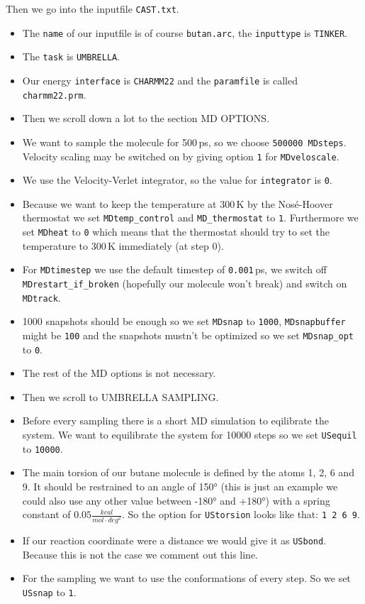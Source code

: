 \documentclass[a4paper,11pt]{scrartcl}
\begin{document}
Then we go into the inputfile \texttt{CAST.txt}.
\begin{itemize}
	\item The \texttt{name} of our inputfile is of course \texttt{butan.arc}, the \texttt{inputtype} is \texttt{TINKER}.
	\item The \texttt{task} is \texttt{UMBRELLA}.
	\item Our energy \texttt{interface} is \texttt{CHARMM22} and the \texttt{paramfile} is called \texttt{charmm22.prm}. 
	\item Then we scroll down a lot to the section MD OPTIONS.
	\item We want to sample the molecule for 500\,ps, so we choose \texttt{500000 MDsteps}. Velocity scaling may be switched on by giving option \texttt{1} for \texttt{MDveloscale}.
	\item We use the Velocity-Verlet integrator, so the value for \texttt{integrator} is \texttt{0}.
	\item Because we want to keep the temperature at 300\,K by the Nosé-Hoover thermostat we set \texttt{MDtemp\_control} and \texttt{MD\_thermostat} to \texttt{1}. Furthermore we set \texttt{MDheat} to \texttt{0} which means that the thermostat should try to set the temperature to 300\,K immediately (at step 0).
	\item For \texttt{MDtimestep} we use the default timestep of \texttt{0.001}\,ps, we switch off \texttt{MDrestart\_if\_broken} (hopefully our molecule won't break) and switch on \texttt{MDtrack}.
	\item 1000 snapshots should be enough so we set \texttt{MDsnap} to \texttt{1000}, \texttt{MDsnapbuffer} might be \texttt{100} and the snapshots mustn't be optimized so we set \texttt{MDsnap\_opt} to \texttt{0}.
	\item The rest of the MD options is not necessary.
	\item Then we scroll to UMBRELLA SAMPLING.
	\item Before every sampling there is a short MD simulation to eqilibrate the system. We want to equilibrate the system for 10000 steps so we set \texttt{USequil} to \texttt{10000}. 
	\item The main torsion of our butane molecule is defined by the atoms 1, 2, 6 and 9. It should be restrained to an angle of 150° (this is just an example we could also use any other value between -180° and +180°) with a spring constant of $0.05 \frac{kcal}{mol \cdot deg^2}$. So the option for \texttt{UStorsion} looks like that: \mbox{\texttt{1 2 6 9}}.
	\item If our reaction coordinate were a distance we would give it as \texttt{USbond}. Because this is not the case we comment out this line.
	\item For the sampling we want to use the conformations of every step. So we set \texttt{USsnap} to \texttt{1}.
\end{itemize}
\end{document}
